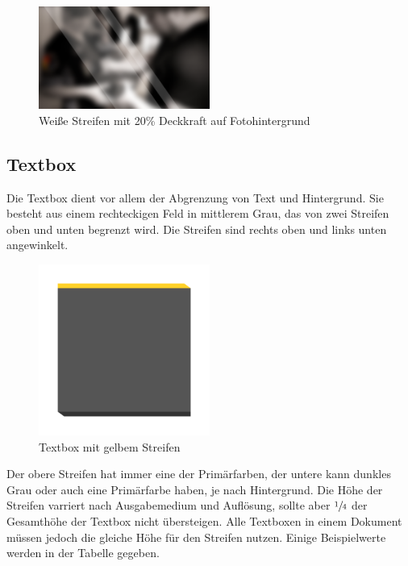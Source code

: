 \documentclass{article}
\begin{document}
\begin{figure}[H]
\begin{center}
\includegraphics[width=0.5\textwidth]{Docs/streifen_foto.png}
\end{center}
\caption{Weiße Streifen mit 20\% Deckkraft auf Fotohintergrund}
\end{figure}

\subsection{Textbox}
Die Textbox dient vor allem der Abgrenzung von Text und Hintergrund. Sie besteht aus einem rechteckigen Feld in mittlerem Grau, das von zwei Streifen oben und unten begrenzt wird. Die Streifen sind rechts oben und links unten angewinkelt.

\begin{figure}[H]
\begin{center}
\includegraphics[width=0.5\textwidth]{Docs/textbox.png}
\end{center}
\caption{Textbox mit gelbem Streifen}
\end{figure}

Der obere Streifen hat immer eine der Primärfarben, der untere kann dunkles Grau oder auch eine Primärfarbe haben, je nach Hintergrund. Die Höhe der Streifen varriert nach Ausgabemedium und Auflösung, sollte aber $\sfrac{1}{4}$ der Gesamthöhe der Textbox nicht übersteigen. Alle Textboxen in einem Dokument müssen jedoch die gleiche Höhe für den Streifen nutzen. Einige Beispielwerte werden in der Tabelle gegeben.
\end{document}
